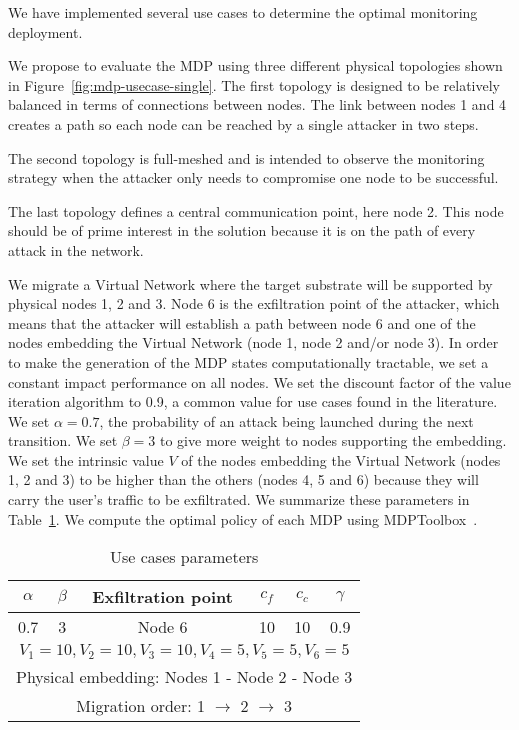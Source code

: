 We have implemented several use cases to determine the optimal monitoring deployment.


We propose to evaluate the MDP using three different physical topologies shown in Figure~\ref{fig:mdp-usecase-single}. The first topology is designed to be relatively balanced in terms of connections between nodes. The link between nodes 1 and 4 creates a path so each node can be reached by a single attacker in two steps.

The second topology is full-meshed and is intended to observe the monitoring strategy when the attacker only needs to compromise one node to be successful.

The last topology defines a central communication point, here node 2. This node should be of prime interest in the solution because it is on the path of every attack in the network.
 
We migrate a Virtual Network where the target substrate will be supported by physical nodes 1, 2 and 3.
Node 6 is the exfiltration point of the attacker, which means that the attacker will establish a path between node 6 and one of the nodes embedding the Virtual Network (\ie node 1, node 2 and/or node 3).
In order to make the generation of the MDP states computationally tractable, we set a constant impact performance on all nodes. We set the discount factor of the value iteration algorithm to 0.9, a common value for use cases found in the literature.
We set $\alpha=0.7$, the probability of an attack being launched during the next transition.
We set $\beta=3$ to give more weight to nodes supporting the embedding.
We set the intrinsic value $V$ of the nodes embedding the Virtual Network (nodes 1, 2 and 3) to be higher than the others (nodes 4, 5 and 6) because they will carry the user's traffic to be exfiltrated.
We summarize these parameters in Table~\ref{tab:mdp-parameters}. 
We compute the optimal policy of each MDP using MDPToolbox~\cite{Chades2014}.

\begin{table}[ht]
\centering
\begin{tabular}{|c|c|l|c|c|c|c|}
\hline
$\alpha$ & \multicolumn{2}{c|}{$\beta$} & Exfiltration point & $c_f$ & $c_c$ & $\gamma$ \\ \hline
0.7      & \multicolumn{2}{c|}{3}       & Node 6             & 10    & 10    & 0.9      \\ \hline
\multicolumn{7}{|c|}{$V_1=10,V_2=10,V_3=10,V_4=5,V_5=5,V_6=5$}                          \\ \hline
\multicolumn{7}{|c|}{Physical embedding: Nodes 1 - Node 2 - Node 3}                     \\ \hline
\multicolumn{7}{|c|}{Migration order: 1 $\rightarrow$ 2 $\rightarrow$ 3}                \\ \hline
\end{tabular}
\caption{Use cases parameters}
\label{tab:mdp-parameters}
\end{table}

